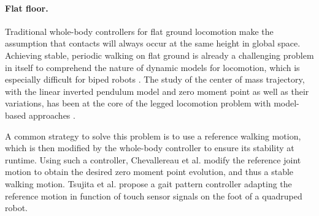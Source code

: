 \paragraph{Flat floor.}
Traditional whole-body controllers for flat ground locomotion make the assumption that contacts will always occur at the same height in global space.
Achieving stable, periodic walking on flat ground is already a challenging problem in itself to comprehend the nature of dynamic models for locomotion, which is especially difficult for biped robots \cite{grizzle_chevallereau_2010}.
The study of the center of mass trajectory, with the linear inverted pendulum model and zero moment point as well as their variations, has been at the core of the legged locomotion problem with model-based approaches \cite{zmp_history, Wieber2016, carpentier_thesis_2017}.

A common strategy to solve this problem is to use a reference walking motion, which is then modified by the whole-body controller to ensure its stability at runtime.
Using such a controller, Chevallereau et al. \cite{Chevallereau_2008_zmp} modify the reference joint motion to obtain the desired zero moment point evolution, and thus a stable walking motion.
Tsujita et al. \cite{gait_pattern_2001} propose a gait pattern controller adapting the reference motion in function of touch sensor signals on the foot of a quadruped robot. %

